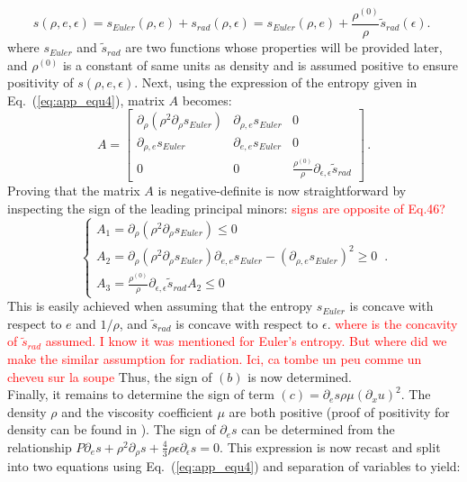 \documentclass[review]{elsarticle}
\newcommand{\eqt}[1]{Eq.~(\ref{#1})}                     %
\newcommand{\tcr}[1]{\textcolor{red}{#1}}
\begin{document}
\begin{appendices}
\begin{equation}
\label{eq:app_equ4}
s(\rho, e, \epsilon) = s_{Euler}(\rho,e) + s_{rad}(\rho, \epsilon) = s_{Euler}(\rho,e) + \frac{\rho^{(0)}}{\rho}\tilde{s}_{rad}(\epsilon) \text{. } 
\end{equation}
where $s_{Euler}$ and $\tilde{s}_{rad}$ are two functions whose properties will be provided later, and $\rho^{(0)}$ is a constant of same units as density and is assumed positive to ensure positivity of $s(\rho,e,\epsilon)$.
Next, using the expression of the entropy given in \eqt{eq:app_equ4}, matrix $A$ becomes:
 \begin{equation}
 A = 
 \left[
 \begin{array}{ccc}
\partial_{\rho} \left( \rho^2 \partial_{\rho} s_{Euler} \right) & \partial_{\rho,e} s_{Euler} & 0 \\
 \partial_{\rho,e} s_{Euler} & \partial_{e,e} s_{Euler} & 0 \\
 0 & 0 & \frac{\rho^{(0)}}{\rho} \partial_{\epsilon,\epsilon} \tilde{s}_{rad}
 \end{array}
 \right]  \,.
 \end{equation}
 Proving that the matrix $A$ is  negative-definite is now straightforward by inspecting the sign of the leading principal minors:
\tcr{signs are opposite of Eq.46?}
 \begin{equation}
 \label{eq:A_matrix}
 \left\{
 \begin{array}{lll}
 A_1 = \partial_{\rho} \left( \rho^2 \partial_{\rho} s_{Euler} \right) \leq 0 \\
 A_2 = \partial_{\rho} \left( \rho^2 \partial_{\rho} s_{Euler} \right) \partial_{e,e} s_{Euler} - \left( \partial_{\rho,e} s_{Euler} \right)^2 \geq 0\\
 A_3 =  \frac{\rho^{(0)}}{\rho} \partial_{\epsilon,\epsilon} \tilde{s}_{rad} A_2 \leq 0
 \end{array}
 \right.  \,.
 \end{equation} 
This is easily achieved when assuming that the entropy $s_{Euler}$ is concave with respect to $e$ and $1/ \rho$, and $\tilde{s}_{rad}$ is concave with respect to $\epsilon$. 
\tcr{where is the concavity of $\tilde{s}_{rad}$ assumed. I know it was mentioned for Euler's entropy. But where did we make the similar assumption for radiation. Ici, ca tombe un peu comme un cheveu sur la soupe}
Thus, the sign of $(b)$ is now determined. \\
%
Finally, it remains to determine the sign of term $(c) = \partial_e s \rho \mu (\partial_x u)^2$. The density $\rho$ and the viscosity coefficient $\mu$ are both positive (proof of positivity for density can be found in \cite{jlg}). The sign of $\partial_e s$ can be determined from the relationship $P \partial_e s + \rho^2 \partial_{\rho} s + \frac{4}{3} \rho \epsilon \partial_{\epsilon} s=0$.  This expression is now recast and split into two equations using \eqt{eq:app_equ4} and separation of variables to yield:

\end{appendices}
\end{document}
